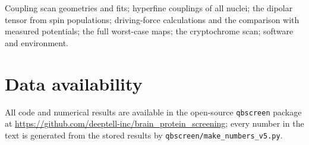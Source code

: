 \documentclass[journal=jpcbfk,manuscript=article,layout=traditional]{achemso}
\begin{document}
\begin{suppinfo}
Coupling scan geometries and fits; hyperfine couplings of all nuclei; the
dipolar tensor from spin populations; driving-force calculations and the
comparison with measured potentials; the full worst-case maps; the
cryptochrome scan; software and environment.
\end{suppinfo}

\section*{Data availability}
All code and numerical results are available in the open-source \texttt{qbscreen}
package at \url{https://github.com/deeptell-inc/brain_protein_screening}; every
number in the text is generated from the stored results by
\texttt{qbscreen/make\_numbers\_v5.py}.


\end{document}
